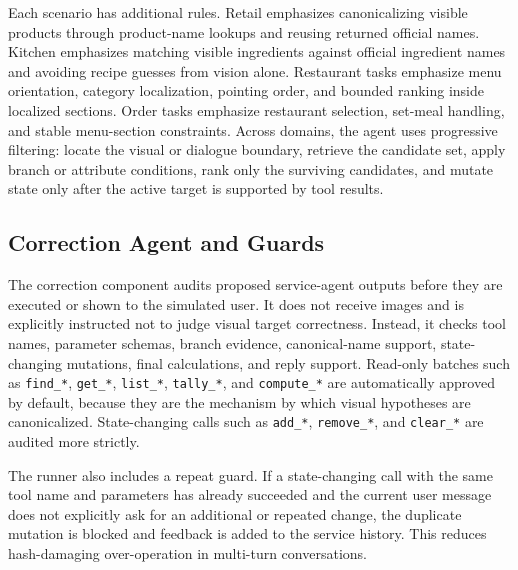 \documentclass[sigconf,nonacm]{acmart}
\begin{document}
Each scenario has additional rules. Retail emphasizes canonicalizing visible
products through product-name lookups and reusing returned official names.
Kitchen emphasizes matching visible ingredients against official ingredient
names and avoiding recipe guesses from vision alone. Restaurant tasks emphasize
menu orientation, category localization, pointing order, and bounded ranking
inside localized sections. Order tasks emphasize restaurant selection, set-meal
handling, and stable menu-section constraints. Across domains, the agent uses
progressive filtering: locate the visual or dialogue boundary, retrieve the
candidate set, apply branch or attribute conditions, rank only the surviving
candidates, and mutate state only after the active target is supported by tool
results.

\subsection{Correction Agent and Guards}

The correction component audits proposed service-agent outputs before they are
executed or shown to the simulated user. It does not receive images and is
explicitly instructed not to judge visual target correctness. Instead, it
checks tool names, parameter schemas, branch evidence, canonical-name support,
state-changing mutations, final calculations, and reply support. Read-only
batches such as \texttt{find\_*}, \texttt{get\_*}, \texttt{list\_*},
\texttt{tally\_*}, and \texttt{compute\_*} are automatically approved by
default, because they are the mechanism by which visual hypotheses are
canonicalized. State-changing calls such as \texttt{add\_*}, \texttt{remove\_*},
and \texttt{clear\_*} are audited more strictly.

The runner also includes a repeat guard. If a state-changing call with the same
tool name and parameters has already succeeded and the current user message
does not explicitly ask for an additional or repeated change, the duplicate
mutation is blocked and feedback is added to the service history. This reduces
hash-damaging over-operation in multi-turn conversations.
\end{document}

